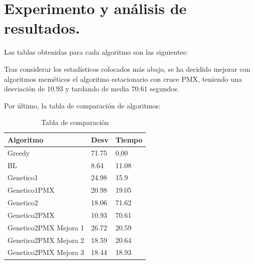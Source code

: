 \newpage
\section{Experimento y análisis de resultados.}

Las tablas obtenidas para cada algoritmo son las siguientes:\\








\newpage


Tras considerar los estadísticos colocados más abajo, se ha decidido mejorar con algoritmos meméticos el algoritmo estacionario con cruce PMX, teniendo una desviación de $10.93$ y tardando de media $70.61$ segundos.

\newpage








\newpage
Por último, la tabla de comparación de algoritmos:

\begin{table}[htbp]
	\begin{center}
		\begin{tabular}{|l|l|l|}
			\hline
			Algoritmo &  Desv & Tiempo\\
			\hline \hline
			Greedy& 71.75 & 0,00\\ \hline
			BL& 8.64& 11.08\\ \hline
			Genetico1 & 24.98 & 15.9\\ \hline
			Genetico1PMX & 20.98& 19.05\\ \hline
			Genetico2 & 18.06 & 71.62\\ \hline
			Genetico2PMX & 10.93 & 70.61\\ \hline
			Genetico2PMX Mejora 1 & 26.72 & 20.59\\ \hline
			Genetico2PMX Mejora 2 & 18.59 & 20.64\\ \hline
			Genetico2PMX Mejora 3 & 18.44 & 18.93\\ \hline
		\end{tabular}
		\caption{Tabla de comparación}
		\label{tabla:TablaComparacion}
	\end{center}
\end{table}

